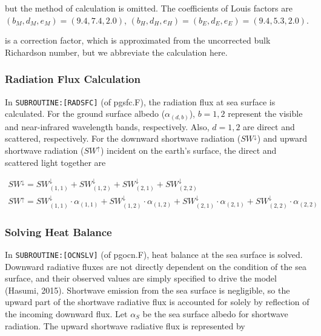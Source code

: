 but the method of calculation is omitted. The coefficients of Louis
factors are \(( b_M, d_M, e_M ) = ( 9.4, 7.4, 2.0 )\),
\(( b_H, d_H, e_H ) = ( b_E, d_E, e_E ) = ( 9.4, 5.3, 2.0 )\).

is a correction factor, which is approximated from the uncorrected bulk
Richardson number, but we abbreviate the calculation here.

\hypertarget{radiation-flux-calculation}{%
\subsubsection{Radiation Flux
Calculation}\label{radiation-flux-calculation}}

In \texttt{SUBROUTINE:{[}RADSFC{]}} (of pgsfc.F), the radiation flux at
sea surface is calculated. For the ground surface albedo
(\(\alpha_{(d,b)}\)), \(b=1,2\) represent the visible and near-infrared
wavelength bands, respectively. Also, \(d=1,2\) are direct and
scattered, respectively. For the downward shortwave radiation
(\(SW^\downarrow\)) and upward shortwave radiation (\(SW^\uparrow\))
incident on the earth's surface, the direct and scattered light together
are

\begin{eqnarray}
    SW^\downarrow = SW^\downarrow_{(1,1)}+SW^\downarrow_{(1,2)}+SW^\downarrow_{(2,1)}+SW^\downarrow_{(2,2)} \\
SW^\uparrow = SW^\downarrow_{(1,1)}\cdot\alpha_{(1,1)}+SW^\downarrow_{(1,2)}\cdot\alpha_{(1,2)}+SW^\downarrow_{(2,1)}\cdot\alpha_{(2,1)}+SW^\downarrow_{(2,2)}\cdot\alpha_{(2,2)}
\end{eqnarray}

\hypertarget{solving-heat-balance}{%
\subsubsection{Solving Heat Balance}\label{solving-heat-balance}}

In \texttt{SUBROUTINE:{[}OCNSLV{]}} (of pgocn.F), heat balance at the
sea surface is solved. Downward radiative fluxes are not directly
dependent on the condition of the sea surface, and their observed values
are simply specified to drive the model (Hasumi, 2015). Shortwave
emission from the sea surface is negligible, so the upward part of the
shortwave radiative flux is accounted for solely by reflection of the
incoming downward flux. Let \(\alpha _S\) be the sea surface albedo for
shortwave radiation. The upward shortwave radiative flux is represented
by

